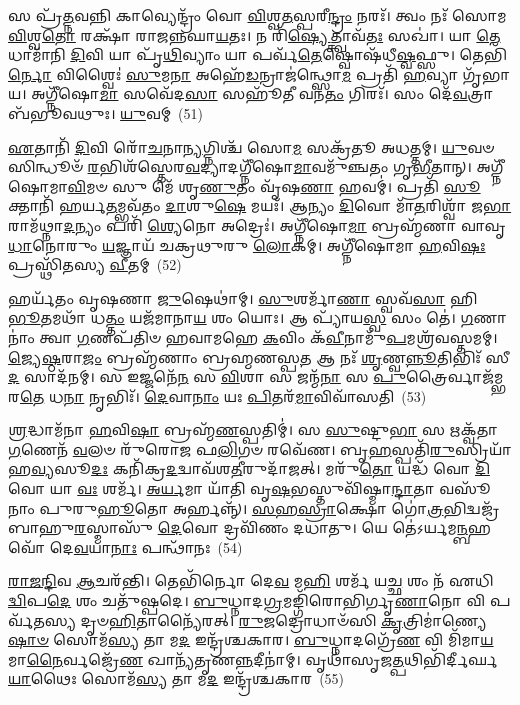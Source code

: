 {\anuvakamend[{\-\ul{𑌏}\-𑌤𑌸𑍍𑌯᳴ 𑌪\-\ul{𑌯}\-𑌸𑍍𑌯𑌾᳴𑌯𑌾𑌮𑍍𑌪𑌾\-\ul{𑌤𑌿} 𑌷𑌡𑍍𑌵𑌿𑍞᳴𑌶𑌤𑌿𑌶𑍍𑌚}]}%

𑌸 𑌪𑍍𑌰᳴\-\ul{𑌤𑍍𑌨}\-𑌵𑌨𑍍𑌨𑌿 𑌕𑌾𑌵𑍍𑌯𑍇𑌨𑍍𑌦𑍍𑌰𑌂᳴ 𑌵𑍋 \ul{𑌵𑌿}\-𑌶𑍍𑌵\-\ul{𑌤}\-𑌸𑍍𑌪𑌰𑍀\-\ul{𑌨𑍍𑌦𑍍𑌰𑌂} 𑌨𑌰𑌃᳴। 𑌤𑍍𑌵𑌂 𑌨𑌃᳴ 𑌸𑍋𑌮 \ul{𑌵𑌿}\-𑌶𑍍𑌵\-\ul{𑌤𑍋} 𑌰𑌕𑍍𑌷𑌾᳴ 𑌰𑌾𑌜𑌨𑍍𑌨𑌘𑌾\-\ul{𑌯}\-𑌤𑌃। 𑌨 𑌰𑌿᳴\-\ul{𑌷𑍍𑌯𑍇}\-𑌤𑍍𑌤𑍍𑌵𑌾𑌵᳴\-\ul{𑌤𑌃} 𑌸𑌖𑌾॑। 𑌯𑌾 \ul{𑌤𑍇} 𑌧𑌾𑌮𑌾᳴𑌨𑌿 \ul{𑌦𑌿}\-𑌵𑌿 𑌯𑌾 𑌪𑍃᳴\-\ul{𑌥𑌿}\-𑌵𑍍𑌯𑌾𑌂 𑌯𑌾 𑌪𑌰𑍍𑌵᳴\-\ul{𑌤𑍇}\-𑌷𑍍𑌵𑍋𑌷᳴𑌧𑍀\-\ul{𑌷𑍍𑌵}\-𑌫𑍍𑌸𑍁। 𑌤𑍇𑌭𑌿᳴\-\ul{𑌰𑍍𑌨𑍋} 𑌵𑌿𑌶𑍍𑌵𑍈𑌃॑ \ul{𑌸𑍁}\-𑌮\-\ul{𑌨𑌾} 𑌅𑌹𑍇᳴\-\ul{𑌡}\-𑌨𑍍𑌰𑌾𑌜॑𑌨𑍍𑌥𑍍𑌸𑍋\-\ul{𑌮} 𑌪𑍍𑌰𑌤𑌿᳴ \ul{𑌹}\-𑌵𑍍𑌯𑌾 𑌗𑍃᳴𑌭𑌾𑌯। 𑌅𑌗𑍍𑌨𑍀᳴𑌷𑍋\-\ul{𑌮𑌾} 𑌸𑌵𑍇᳴𑌦\-\ul{𑌸𑌾} 𑌸𑌹𑍂᳴𑌤𑍀 𑌵𑌨\-\ul{𑌤𑌂} 𑌗𑌿𑌰𑌃᳴। 𑌸𑌂 𑌦𑍇᳴\-\ul{𑌵}\-𑌤𑍍𑌰𑌾 𑌬᳴𑌭𑍂𑌵𑌥𑍁𑌃। \ul{𑌯𑍁}\-𑌵𑌮𑍍~(51)

\-\ul{𑌏}\-𑌤𑌾𑌨𑌿᳴ \ul{𑌦𑌿}\-𑌵𑌿 𑌰𑍋᳴\-\ul{𑌚}\-𑌨𑌾\-\ul{𑌨𑍍𑌯}\-𑌗𑍍𑌨𑌿𑌶𑍍𑌚᳴ 𑌸𑍋\-\ul{𑌮} 𑌸𑌕𑍍𑌰᳴𑌤𑍂 𑌅𑌧𑌤𑍍𑌤𑌮𑍍। \ul{𑌯𑍁}\-𑌵𑍞 𑌸𑌿𑌨𑍍𑌧𑍂𑍞᳴ \ul{𑌰}\-𑌭𑌿𑌶᳴𑌸𑍍𑌤𑍇𑌰\-\ul{𑌵}\-𑌦𑍍𑌯𑌾𑌦𑌗𑍍𑌨𑍀᳴𑌷𑍋\-\ul{𑌮𑌾}\-𑌵𑌮𑍁᳴𑌞𑍍𑌚𑌤𑌂 𑌗𑍃\-\ul{𑌭𑍀}\-𑌤𑌾𑌨𑍍। 𑌅𑌗𑍍𑌨𑍀᳴𑌷𑍋𑌮𑌾\-\ul{𑌵𑌿}\-𑌮𑍞 𑌸𑍁 𑌮𑍇᳴ 𑌶𑍃\-\ul{𑌣𑍁}\-𑌤𑌂 𑌵𑍃᳴𑌷\-\ul{𑌣𑌾} 𑌹𑌵𑌮𑍍॑। 𑌪𑍍𑌰𑌤𑌿᳴ \ul{𑌸𑍂}\-𑌕𑍍𑌤𑌾𑌨𑌿᳴ 𑌹𑌰𑍍𑌯\-\ul{𑌤}\-𑌮𑍍𑌭𑌵᳴𑌤𑌂 \ul{𑌦𑌾}\-𑌶𑍁\-\ul{𑌷𑍇} 𑌮𑌯𑌃᳴। 𑌆𑌨𑍍𑌯𑌂 \ul{𑌦𑌿}\-𑌵𑍋 𑌮𑌾᳴\-\ul{𑌤}\-𑌰𑌿𑌶𑍍𑌵𑌾᳴ 𑌜\-\ul{𑌭𑌾}\-𑌰𑌾𑌮᳴𑌥𑍍𑌨𑌾\-\ul{𑌦}\-𑌨𑍍𑌯𑌂 𑌪𑌰𑌿᳴ \ul{𑌶𑍍𑌯𑍇}\-𑌨𑍋 𑌅𑌦𑍍𑌰𑍇𑌃॑। 𑌅𑌗𑍍𑌨𑍀᳴𑌷𑍋\-\ul{𑌮𑌾} 𑌬𑍍𑌰𑌹𑍍𑌮᳴𑌣𑌾 𑌵𑌾𑌵𑍃\-\ul{𑌧𑌾}\-𑌨𑍋𑌰𑍁𑌂 \ul{𑌯}\-𑌜𑍍𑌞𑌾𑌯᳴ 𑌚𑌕𑍍𑌰𑌥𑍁𑌰𑍁 \ul{𑌲𑍋}\-𑌕𑌮𑍍। 𑌅𑌗𑍍𑌨𑍀᳴𑌷𑍋𑌮𑌾 \ul{𑌹}\-𑌵𑌿\-\ul{𑌷𑌃} 𑌪𑍍𑌰𑌸𑍍𑌥𑌿᳴𑌤𑌸𑍍𑌯 \ul{𑌵𑍀}\-𑌤𑌮𑍍~(52)

𑌹𑌰𑍍𑌯᳴𑌤𑌂 𑌵𑍃𑌷𑌣𑌾 \ul{𑌜𑍁}\-𑌷𑍇𑌥𑌾॑𑌮𑍍। \ul{𑌸𑍁}\-𑌶𑌰𑍍𑌮𑌾᳴\-\ul{𑌣𑌾} 𑌸𑍍𑌵𑌵᳴\-\ul{𑌸𑌾} 𑌹𑌿 \ul{𑌭𑍂}\-𑌤𑌮𑌥𑌾᳴ 𑌧\-\ul{𑌤𑍍𑌤𑌂} 𑌯𑌜᳴𑌮𑌾𑌨𑌾\-\ul{𑌯} 𑌶𑌂 𑌯𑍋𑌃। 𑌆 𑌪𑍍𑌯𑌾᳴𑌯\-\ul{𑌸𑍍𑌵} 𑌸𑌂 𑌤𑍇॑। \ul{𑌗}\-𑌣𑌾𑌨𑌾𑌂॑ 𑌤𑍍𑌵𑌾 \ul{𑌗}\-𑌣𑌪᳴𑌤𑌿𑍞 𑌹𑌵𑌾𑌮𑌹𑍇 \ul{𑌕}\-𑌵𑌿𑌂 𑌕᳴\-\ul{𑌵𑍀}\-𑌨𑌾𑌮𑍁᳴\-\ul{𑌪}\-𑌮𑌶𑍍𑌰᳴𑌵𑌸𑍍𑌤𑌮𑌮𑍍। \ul{𑌜𑍍𑌯𑍇}\-\-\ul{𑌷𑍍𑌠}\-𑌰𑌾\-\ul{𑌜𑌂} 𑌬𑍍𑌰𑌹𑍍𑌮᳴𑌣𑌾𑌂 𑌬𑍍𑌰𑌹𑍍𑌮𑌣𑌸𑍍𑌪\-\ul{𑌤} 𑌆 𑌨𑌃᳴ \ul{𑌶𑍃}\-𑌣𑍍𑌵\-\ul{𑌨𑍍𑌨𑍂}\-𑌤𑌿𑌭𑌿𑌃᳴ 𑌸𑍀\-\ul{𑌦} 𑌸𑌾𑌦᳴𑌨𑌮𑍍। 𑌸 𑌇𑌜𑍍𑌜𑌨𑍇᳴\-\ul{𑌨} 𑌸 \ul{𑌵𑌿}\-𑌶𑌾 𑌸 𑌜𑌨𑍍𑌮᳴\-\ul{𑌨𑌾} 𑌸 \ul{𑌪𑍁}\-𑌤𑍍𑌰𑍈𑌰𑍍𑌵𑌾𑌜᳴𑌮𑍍𑌭𑌰\-\ul{𑌤𑍇} 𑌧\-\ul{𑌨𑌾} 𑌨𑍃𑌭𑌿𑌃᳴। \ul{𑌦𑍇}\-𑌵𑌾\-\ul{𑌨𑌾𑌂} 𑌯𑌃 \ul{𑌪𑌿}\-𑌤𑌰᳴\-\ul{𑌮𑌾}\-𑌵𑌿𑌵𑌾᳴𑌸𑌤𑌿~(53)

\-\ul{𑌶𑍍𑌰}\-𑌦𑍍𑌧𑌾𑌮᳴𑌨𑌾 \ul{𑌹}\-𑌵𑌿\-\ul{𑌷𑌾} 𑌬𑍍𑌰𑌹𑍍𑌮᳴\-\ul{𑌣}\-𑌸𑍍𑌪𑌤𑌿𑌮𑍍॑। 𑌸 \ul{𑌸𑍁}\-𑌷𑍍𑌟𑍁\-\ul{𑌭𑌾} 𑌸 𑌋𑌕𑍍𑌵᳴𑌤𑌾 \ul{𑌗}\-𑌣𑍇𑌨᳴ \ul{𑌵}\-𑌲𑍞 𑌰𑍁᳴𑌰𑍋𑌜 𑌫\-\ul{𑌲𑌿}\-𑌗𑍞 𑌰𑌵𑍇᳴𑌣। 𑌬𑍃\-\ul{𑌹}\-𑌸𑍍𑌪𑌤𑌿᳴\-\ul{𑌰𑍁}\-𑌸𑍍𑌰𑌿𑌯𑌾᳴ 𑌹\-\ul{𑌵𑍍𑌯}\-𑌸𑍂\-\ul{𑌦𑌃} 𑌕𑌨𑌿᳴𑌕𑍍𑌰\-\ul{𑌦}\-𑌦𑍍𑌵𑌾𑌵᳴𑌶\-\ul{𑌤𑍀}\-𑌰𑍁𑌦𑌾᳴𑌜𑌤𑍍। 𑌮𑌰𑍁᳴\-\ul{𑌤𑍋} 𑌯𑌦𑍍𑌧᳴ 𑌵𑍋 \ul{𑌦𑌿}\-𑌵𑍋 𑌯𑌾 \ul{𑌵𑌃} 𑌶𑌰𑍍𑌮᳴। \ul{𑌅}\-\-\ul{𑌰𑍍𑌯}\-𑌮𑌾 𑌯𑌾᳴𑌤𑌿 𑌵𑍃\-\ul{𑌷}\-𑌭𑌸𑍍𑌤𑍁𑌵𑌿᳴𑌷𑍍𑌮𑌾\-\ul{𑌨𑍍𑌦𑌾}\-𑌤𑌾 𑌵𑌸𑍂᳴𑌨𑌾𑌂 𑌪𑍁𑌰𑍁\-\ul{𑌹𑍂}\-𑌤𑍋 𑌅𑌰𑍍\mbox{}𑌹𑌨𑍍𑌨𑍍᳴। \ul{𑌸}\-\-\ul{𑌹}\-\-\ul{𑌸𑍍𑌰𑌾}\-𑌕𑍍𑌷𑍋 𑌗𑍋॑\-\ul{𑌤𑍍𑌰}\-𑌭𑌿𑌦𑍍𑌵𑌜𑍍𑌰᳴𑌬𑌾𑌹𑍁\-\ul{𑌰}\-𑌸𑍍𑌮𑌾𑌸𑍁᳴ \ul{𑌦𑍇}\-𑌵𑍋 𑌦𑍍𑌰𑌵𑌿᳴𑌣𑌂 𑌦𑌧𑌾𑌤𑍁। 𑌯𑍇 𑌤𑍇॑\-𑌽𑌰𑍍𑌯𑌮\-\ul{𑌨𑍍𑌬}\-𑌹𑌵𑍋᳴ 𑌦𑍇\-\ul{𑌵}\-𑌯𑌾\-\ul{𑌨𑌾𑌃} 𑌪𑌨𑍍𑌥𑌾᳴𑌨𑌃~(54)

\-\ul{𑌰𑌾}\-\-\ul{𑌜}\-\-\ul{𑌨𑍍𑌦𑌿}\-𑌵 \ul{𑌆}\-𑌚𑌰᳴𑌨𑍍𑌤𑌿। 𑌤𑍇𑌭𑌿᳴𑌰𑍍𑌨𑍋 𑌦𑍇\-\ul{𑌵} 𑌮\-\ul{𑌹𑌿} 𑌶𑌰𑍍𑌮᳴ 𑌯\-\ul{𑌚𑍍𑌛} 𑌶𑌂 𑌨᳴ 𑌏𑌧𑌿 \ul{𑌦𑍍𑌵𑌿}\-𑌪\-\ul{𑌦𑍇} 𑌶𑌂 𑌚𑌤𑍁᳴𑌷𑍍𑌪𑌦𑍇। \ul{𑌬𑍁}\-𑌧𑍍𑌨𑌾𑌦\-\ul{𑌗𑍍𑌰}\-𑌮𑌙𑍍𑌗𑌿᳴𑌰𑍋𑌭𑌿𑌰𑍍𑌗𑍃\-\ul{𑌣𑌾}\-𑌨𑍋 𑌵𑌿 𑌪𑌰𑍍𑌵᳴𑌤𑌸𑍍𑌯 𑌦𑍃𑍞\-\ul{𑌹𑌿}\-𑌤𑌾𑌨𑍍𑌯𑍈᳴𑌰𑌤𑍍। \ul{𑌰𑍁}\-𑌜𑌦𑍍𑌰𑍋𑌧𑌾𑍞᳴𑌸𑌿 \ul{𑌕𑍃}\-𑌤𑍍𑌰𑌿𑌮𑌾॑𑌣𑍍𑌯𑍇\-\ul{𑌷𑌾}\-\-\ul{𑍞} 𑌸𑍋𑌮᳴\-\ul{𑌸𑍍𑌯} 𑌤𑌾 𑌮\-\ul{𑌦} 𑌇𑌨𑍍𑌦𑍍𑌰᳴𑌶𑍍𑌚𑌕𑌾𑌰। \ul{𑌬𑍁}\-𑌧𑍍𑌨𑌾𑌦𑌗𑍍𑌰𑍇᳴\-\ul{𑌣} 𑌵𑌿 𑌮𑌿᳴𑌮𑌾\-\ul{𑌯} 𑌮𑌾\-\ul{𑌨𑍈}\-𑌰𑍍𑌵𑌜𑍍𑌰𑍇᳴\-\ul{𑌣} 𑌖𑌾𑌨𑍍𑌯᳴𑌤𑍃𑌣\-\ul{𑌨𑍍𑌨}\-𑌦𑍀𑌨𑌾॑𑌮𑍍। 𑌵𑍃𑌥𑌾᳴𑌸𑍃𑌜\-\ul{𑌤𑍍𑌪}\-𑌥𑌿𑌭𑌿᳴𑌰𑍍𑌦𑍀𑌰𑍍𑌘\-\ul{𑌯𑌾}\-𑌥𑍈𑌃 𑌸𑍋𑌮᳴\-\ul{𑌸𑍍𑌯} 𑌤𑌾 𑌮\-\ul{𑌦} 𑌇𑌨𑍍𑌦𑍍𑌰᳴𑌶𑍍𑌚𑌕𑌾𑌰~(55)

